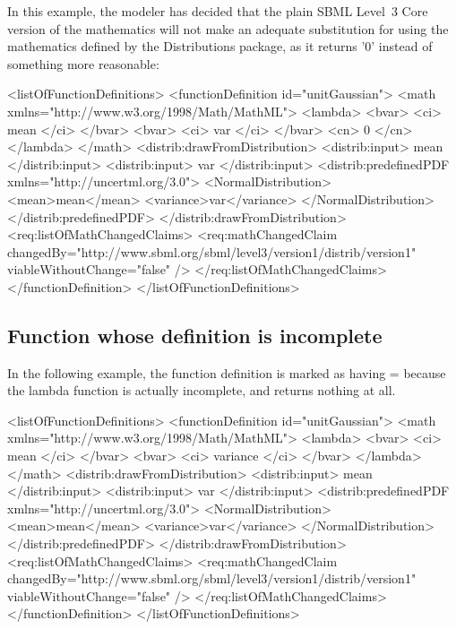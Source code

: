 In this example, the modeler has decided that the plain SBML Level~3 Core version of the mathematics will not make an adequate substitution for using the mathematics defined by the Distributions package, as it returns '0' instead of something more reasonable:

\begin{example}
<listOfFunctionDefinitions> 
  <functionDefinition id="unitGaussian"> 
    <math xmlns="http://www.w3.org/1998/Math/MathML"> 
      <lambda>
        <bvar>
          <ci> mean </ci>
        </bvar>
        <bvar>
          <ci> var </ci>
        </bvar>
        <cn> 0 </cn>
      </lambda>
    </math> 
    <distrib:drawFromDistribution>
      <distrib:input> mean </distrib:input>
      <distrib:input> var </distrib:input>
      <distrib:predefinedPDF xmlns="http://uncertml.org/3.0">
         <NormalDistribution>
           <mean>mean</mean>
           <variance>var</variance>
         </NormalDistribution>
      </distrib:predefinedPDF>
    </distrib:drawFromDistribution>
    <req:listOfMathChangedClaims>
      <req:mathChangedClaim changedBy="http://www.sbml.org/sbml/level3/version1/distrib/version1"
                            viableWithoutChange="false" />
    </req:listOfMathChangedClaims>
  </functionDefinition> 
</listOfFunctionDefinitions> 
\end{example} 


\subsection{Function whose definition is incomplete}

In the following example, the function definition is marked as having = because the lambda function is actually incomplete, and returns nothing at all.

\begin{example}
<listOfFunctionDefinitions> 
  <functionDefinition id="unitGaussian"> 
    <math xmlns="http://www.w3.org/1998/Math/MathML"> 
      <lambda>
        <bvar>
          <ci> mean </ci>
        </bvar>
        <bvar>
          <ci> variance </ci>
        </bvar>
      </lambda>
    </math> 
    <distrib:drawFromDistribution>
      <distrib:input> mean </distrib:input>
      <distrib:input> var </distrib:input>
      <distrib:predefinedPDF xmlns="http://uncertml.org/3.0">
         <NormalDistribution>
           <mean>mean</mean>
           <variance>var</variance>
         </NormalDistribution>
      </distrib:predefinedPDF>
    </distrib:drawFromDistribution>
    <req:listOfMathChangedClaims>
      <req:mathChangedClaim changedBy="http://www.sbml.org/sbml/level3/version1/distrib/version1"
                            viableWithoutChange="false" />
    </req:listOfMathChangedClaims>
  </functionDefinition> 
</listOfFunctionDefinitions> 
\end{example}
